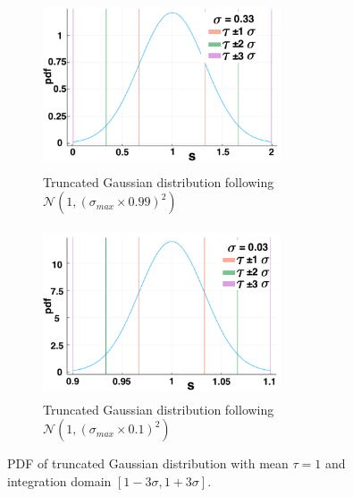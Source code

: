 \documentclass[12pt]{report}
\begin{document}
\begin{figure}[H]
    \centering
    \begin{subfigure}[b]{0.45\textwidth}
        \centering
        \includegraphics[width=7cm,height=5cm]{t1sig1.png}
        \caption{Truncated Gaussian distribution following $\mathcal{N}(1,(\sigma_{max}\times0.99)^2)$}
        \label{}
    \end{subfigure}
    \hfill
    \begin{subfigure}[b]{0.45\textwidth}
        \centering
        \includegraphics[width=7cm,height=5cm]{t1sig2.png}
        \caption{Truncated Gaussian distribution following $\mathcal{N}(1,(\sigma_{max}\times0.1)^2)$}
        \label{}
    \end{subfigure}
\caption{PDF of truncated Gaussian distribution with mean $\tau=1$ and integration domain $[1-3\sigma,1+3\sigma]$.}
\label{fig:pdf1}
\end{figure}
\end{document}
